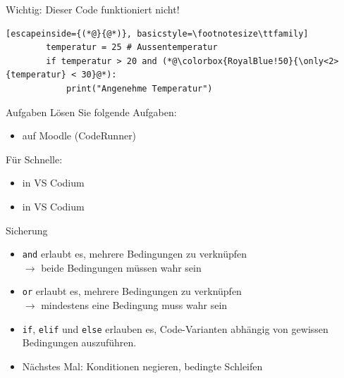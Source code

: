 \begin{frame}[fragile]{Wichtig: Dieser Code funktioniert nicht!}

    \begin{lstlisting}[escapeinside={(*@}{@*)}, basicstyle=\footnotesize\ttfamily]
        temperatur = 25 # Aussentemperatur
        if temperatur > 20 and (*@\colorbox{RoyalBlue!50}{\only<2>{temperatur} < 30}@*):
            print("Angenehme Temperatur")
    \end{lstlisting}
\end{frame}


\begin{frame}{Aufgaben}
    Lösen Sie folgende Aufgaben:
    \begin{itemize}
        \item {} auf Moodle (CodeRunner)
    \end{itemize}
    
    Für Schnelle:
    \begin{itemize}
        \item {} in VS Codium
        \item {} in VS Codium
    \end{itemize}
\end{frame}

\begin{frame}{Sicherung}
    \begin{itemize}[<+->]
        \item \faCheckSquare{} \lstinline|and| erlaubt es, mehrere Bedingungen zu verknüpfen\\
        $\rightarrow$ beide Bedingungen müssen wahr sein
        \item \faCheckSquare{} \lstinline|or| erlaubt es, mehrere Bedingungen zu verknüpfen\\
        $\rightarrow$ mindestens eine Bedingung muss wahr sein
        \item \faCheckSquare{} \lstinline|if|, \lstinline|elif| und \lstinline|else| erlauben es, Code-Varianten abhängig von gewissen Bedingungen auszuführen.
        \item \faSquare{} Nächstes Mal: Konditionen negieren, bedingte Schleifen
    \end{itemize}
\end{frame}
